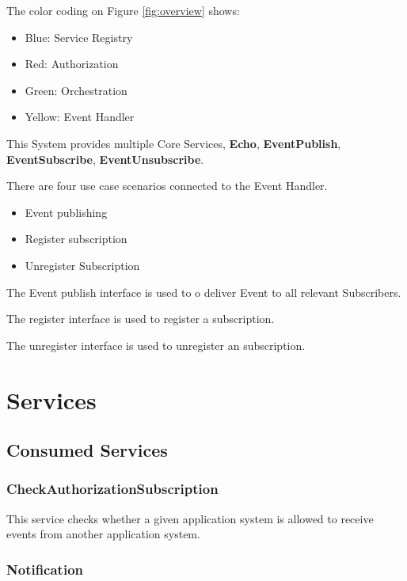 \documentclass[a4paper]{arrowhead}
\newcommand{\spdef}[2]{{\textcolor{ArrowheadBlue}{#2\label{sec:services:produced:#1}}}}
\begin{document}
The color coding on Figure \ref{fig:overview} shows:

 \begin{itemize}
      \item Blue: Service Registry
      \item Red: Authorization
      \item Green: Orchestration
      \item Yellow: Event Handler
  \end{itemize}

This System provides multiple Core Services, \textbf{Echo}, \textbf{EventPublish}, \textbf{EventSubscribe}, \textbf{EventUnsubscribe}.


There are four use case scenarios connected to the Event Handler.
\begin{itemize}
    \item Event publishing
    \item Register subscription
    \item Unregister Subscription
\end{itemize}

The Event publish interface is used to o deliver Event to all relevant Subscribers. 

The register interface is used to register a subscription.

The unregister interface is used to unregister an subscription.

\section{Services}
\label{sec:services}


\subsection{Consumed Services}

\subsubsection{\spdef{CheckAuthorizationSubscription}{CheckAuthorizationSubscription}}

This service checks whether a given application system is allowed to receive events from another application system.

\subsubsection{\spdef{Notification}{Notification}}
\end{document}

